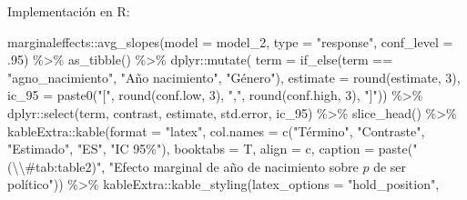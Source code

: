 \documentclass[
  12pt,
  a4paper,
]{article}
\newenvironment{Shaded}{\begin{snugshade}}{\end{snugshade}}
\newcommand{\AttributeTok}[1]{\textcolor[rgb]{0.77,0.63,0.00}{#1}}
\newcommand{\DecValTok}[1]{\textcolor[rgb]{0.00,0.00,0.81}{#1}}
\newcommand{\FunctionTok}[1]{\textcolor[rgb]{0.00,0.00,0.00}{#1}}
\newcommand{\NormalTok}[1]{#1}
\newcommand{\SpecialCharTok}[1]{\textcolor[rgb]{0.00,0.00,0.00}{#1}}
\newcommand{\StringTok}[1]{\textcolor[rgb]{0.31,0.60,0.02}{#1}}
\begin{document}
Implementación en R:

\begin{Shaded}
\begin{Highlighting}[]
\NormalTok{marginaleffects}\SpecialCharTok{::}\FunctionTok{avg\_slopes}\NormalTok{(}\AttributeTok{model =}\NormalTok{ model\_2, }
                            \AttributeTok{type =} \StringTok{"response"}\NormalTok{, }
                            \AttributeTok{conf\_level =}\NormalTok{ .}\DecValTok{95}\NormalTok{) }\SpecialCharTok{\%\textgreater{}\%} 
  \FunctionTok{as\_tibble}\NormalTok{() }\SpecialCharTok{\%\textgreater{}\%} 
\NormalTok{  dplyr}\SpecialCharTok{::}\FunctionTok{mutate}\NormalTok{(}
    \AttributeTok{term =} \FunctionTok{if\_else}\NormalTok{(term }\SpecialCharTok{==} \StringTok{"agno\_nacimiento"}\NormalTok{, }\StringTok{"Año nacimiento"}\NormalTok{, }
                   \StringTok{"Género"}\NormalTok{),}
    \AttributeTok{estimate =} \FunctionTok{round}\NormalTok{(estimate, }\DecValTok{3}\NormalTok{),}
    \AttributeTok{ic\_95 =} \FunctionTok{paste0}\NormalTok{(}\StringTok{"["}\NormalTok{, }\FunctionTok{round}\NormalTok{(conf.low, }\DecValTok{3}\NormalTok{), }\StringTok{","}\NormalTok{, }
                   \FunctionTok{round}\NormalTok{(conf.high, }\DecValTok{3}\NormalTok{), }\StringTok{"]"}\NormalTok{)) }\SpecialCharTok{\%\textgreater{}\%} 
\NormalTok{  dplyr}\SpecialCharTok{::}\FunctionTok{select}\NormalTok{(term, contrast, estimate, std.error, ic\_95) }\SpecialCharTok{\%\textgreater{}\%}
  \FunctionTok{slice\_head}\NormalTok{() }\SpecialCharTok{\%\textgreater{}\%} 
\NormalTok{  kableExtra}\SpecialCharTok{::}\FunctionTok{kable}\NormalTok{(}\AttributeTok{format =} \StringTok{"latex"}\NormalTok{, }
                    \AttributeTok{col.names =} \FunctionTok{c}\NormalTok{(}\StringTok{"Término"}\NormalTok{, }\StringTok{"Contraste"}\NormalTok{, }
                                  \StringTok{"Estimado"}\NormalTok{, }\StringTok{"ES"}\NormalTok{, }\StringTok{"IC 95\%"}\NormalTok{),}
                    \AttributeTok{booktabs =}\NormalTok{ T, }
                    \AttributeTok{align =} \StringTok{\textquotesingle{}c\textquotesingle{}}\NormalTok{,}
                    \AttributeTok{caption =} \FunctionTok{paste}\NormalTok{(}\StringTok{"(}\SpecialCharTok{\textbackslash{}\textbackslash{}}\StringTok{\#tab:table2)"}\NormalTok{,}
                                    \StringTok{"Efecto marginal de año de nacimiento sobre $p$ }
\StringTok{                                    de ser político"}\NormalTok{)) }\SpecialCharTok{\%\textgreater{}\%} 
\NormalTok{  kableExtra}\SpecialCharTok{::}\FunctionTok{kable\_styling}\NormalTok{(}\AttributeTok{latex\_options =} \StringTok{"hold\_position"}\NormalTok{, }

\end{Highlighting}
\end{Shaded}
\end{document}
